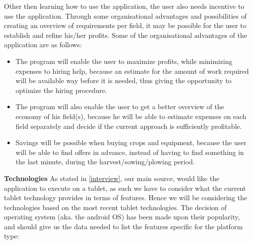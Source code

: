 Other then learning how to use the application, the user also needs incentive to use the application. Through some organisational advantages and possibilities of creating an overview of requirements per field, it may be possible for the user to establish and refine his/her profits. Some of the organisational advantages of the application are as follows:
\begin{itemize}[noitemsep]
    \item The program will enable the user to maximize profits, while minimizing expenses to hiring help, because an estimate for the amount of work required will be available way before it is needed, thus giving the opportunity to optimize the hiring procedure.
    \item The program will also enable the user to get a better overview of the economy of his field(s), because he will be able to estimate expenses on each field separately and decide if the current approach is sufficiently profitable.
    \item Savings will be possible when buying crops and equipment, because the user will be able to find offers in advance, instead of having to find something in the last minute, during the harvest/sowing/plowing period.
\end{itemize}

\textbf{Technologies}\newline
As stated in \autoref{interview}, our main source, would like the application to execute on a tablet, as such we have to consider what the current tablet technology provides in terms of features. Hence we will be considering the technologies based on the most recent tablet technologies\cite{google:android_specs}. The decision of operating system (aka. the android OS) has been made upon their popularity\cite{statista:global_tablet_shipments}, and should give us the data needed to list the features specific for the platform type:

